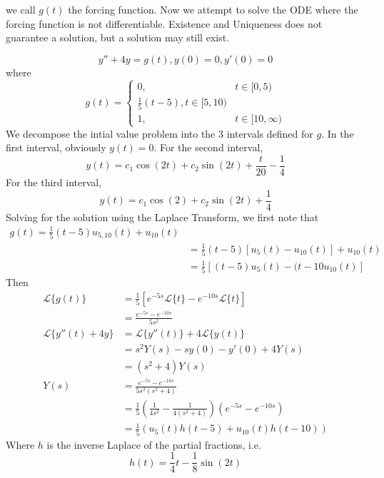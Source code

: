 \documentclass[12pt]{article}
\begin{document}
we call $g(t)$ the forcing function. Now we attempt to solve the ODE where the forcing function is not differentiable. Existence and Uniqueness does not guarantee a solution, but a solution may still exist.

\begin{ex}
	$$y'' + 4y = g(t), y(0) = 0, y'(0) = 0$$
	where
	$$g(t) = \begin{cases} 0, & t \in [0,5) \\ \frac{1}{5}(t-5), t \in [5,10) \\ 1, & t \in [10,\infty)\end{cases}$$
	We decompose the intial value problem into the 3 intervals defined for $g$. In the first interval, obviously $y(t) = 0$. For the second interval,
	$$y(t) = c_1\cos(2t) + c_2\sin(2t) + \frac{t}{20} - \frac{1}{4}$$
	For the third interval,
	$$y(t) = c_1\cos(2) + c_2\sin(2t) + \frac{1}{4}$$
	Solving for the solution using the Laplace Transform, we first note that
	\begin{align*}
		g(t) = \frac{1}{5}(t-5)u_{5,10}(t) + u_{10}(t) \\
		&= \frac{1}{5}(t-5)[u_5(t) - u_{10}(t)] + u_{10}(t) \\
		&= \frac{1}{5}[(t-5)u_5(t) - (t-10u_{10}(t)]
	\end{align*}
	Then
	\begin{align*}
		\mathcal{L}\{g(t)\} &= \frac{1}{5}[e^{-5s}\mathcal{L}\{t\} - e^{-10s}\mathcal{L}\{t\}] \\
				    &= \frac{e^{-5s} - e^{-10s}}{5s^2} \\
		\mathcal{L}\{y''(t) + 4y\} &= \mathcal{L}\{y''(t)\} + 4\mathcal{L}\{y(t)\} \\
					   &= s^2Y(s) - sy(0) - y'(0) + 4Y(s) \\
					   &= (s^2+4)Y(s) \\
		Y(s) &= \frac{e^{-5s}-e^{-10s}}{5s^2(s^2+4)} \\
		     &= \frac{1}{5}\left(\frac{1}{4s^2}-\frac{1}{4(s^2+4)}\right)\left(e^{-5s} - e^{-10s}\right) \\
		     &= \frac{1}{5}\left(u_5(t)h(t-5) + u_{10}(t)h(t-10)\right)
	\end{align*}
	Where $h$ is the inverse Laplace of the partial fractions, i.e.
	$$h(t) = \frac{1}{4}t - \frac{1}{8}\sin(2t)$$
\end{ex}
\end{document}
